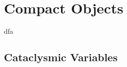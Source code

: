 

\chapter{Compact Objects}
\thispagestyle{empty}


dfa

	\section{Cataclysmic Variables}



\cite{harris_catalog_1996}


\clearpage

\thispagestyle{empty}

